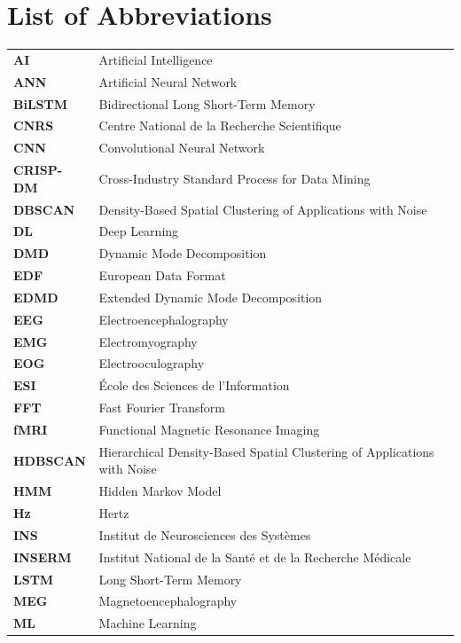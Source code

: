 \documentclass[a4paper,12pt,twoside]{article}
\begin{document}
\clearpage


\section*{List of Abbreviations}

\begin{tabular}{ll}
\textbf{AI} & Artificial Intelligence \\
\textbf{ANN} & Artificial Neural Network \\
\textbf{BiLSTM} & Bidirectional Long Short-Term Memory \\
\textbf{CNRS} & Centre National de la Recherche Scientifique \\
\textbf{CNN} & Convolutional Neural Network \\
\textbf{CRISP-DM} & Cross-Industry Standard Process for Data Mining \\
\textbf{DBSCAN} & Density-Based Spatial Clustering of Applications with Noise \\
\textbf{DL} & Deep Learning \\
\textbf{DMD} & Dynamic Mode Decomposition \\
\textbf{EDF} & European Data Format \\
\textbf{EDMD} & Extended Dynamic Mode Decomposition \\
\textbf{EEG} & Electroencephalography \\
\textbf{EMG} & Electromyography \\
\textbf{EOG} & Electrooculography \\
\textbf{ESI} & École des Sciences de l'Information \\
\textbf{FFT} & Fast Fourier Transform \\
\textbf{fMRI} & Functional Magnetic Resonance Imaging \\
\textbf{HDBSCAN} & Hierarchical Density-Based Spatial Clustering of Applications with Noise \\
\textbf{HMM} & Hidden Markov Model \\
\textbf{Hz} & Hertz \\
\textbf{INS} & Institut de Neurosciences des Systèmes \\
\textbf{INSERM} & Institut National de la Santé et de la Recherche Médicale \\
\textbf{LSTM} & Long Short-Term Memory \\
\textbf{MEG} & Magnetoencephalography \\
\textbf{ML} & Machine Learning \\

\end{tabular}
\end{document}
